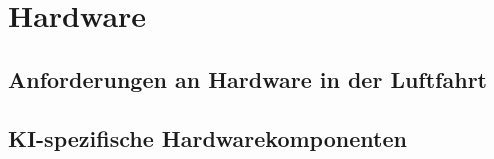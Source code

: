 \part{Hardware}
\chapter{Anforderungen an Hardware in der Luftfahrt}

\chapter{KI-spezifische Hardwarekomponenten}

